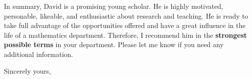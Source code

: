 In summary, David   is a promising young scholar.
He is highly motivated, personable, likeable, and enthusiastic 
about  research and  teaching.  
He is ready to take full advantage of the opportunities 
offered and have a great influence in the life of a mathematics department. 
 Therefore, I recommend him in the {\bf strongest possible terms} in your department.
Please let me know if you need any additional information.






\closing{Sincerely yours,}

